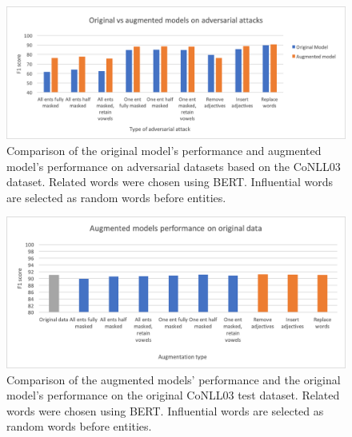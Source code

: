 \begin{table}[h]
\begin{singlespace}
{
    }
    \end{singlespace}
    \caption{Comparison of the original model's performance and augmented model's performance on adversarial datasets based on the CoNLL03 dataset. Related words were chosen using BERT. Influential words are selected as random words before entities.}
    \label{tab:advtraining}
\end{table}

\vspace{75px}
 
 \begin{figure}[h]
	\centering
	\includegraphics[width=0.85\linewidth]{LatexDiss/figures/advtraining.png}
	\caption{Comparison of the original model's performance and augmented model's performance on adversarial datasets based on the CoNLL03 dataset. Related words were chosen using BERT. Influential words are selected as random words before entities.}
	\label{fig:advtraining}
\end{figure}

 \begin{figure}[h]
	\centering
	\includegraphics[width=0.85\linewidth]{LatexDiss/figures/augmodelsorigdata.png}
	\caption{Comparison of the augmented models' performance and the original model's performance on the original CoNLL03 test dataset. Related words were chosen using BERT. Influential words are selected as random words before entities.}
	\label{fig:augmodelsorigdata}
\end{figure}

